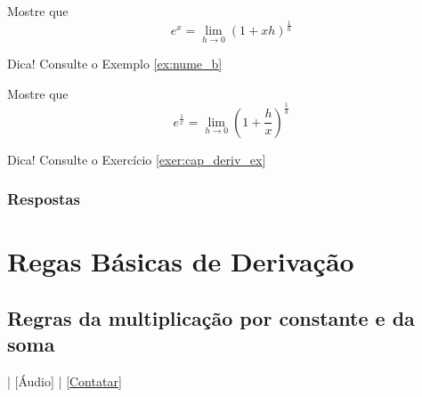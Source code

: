 \begin{exer}\label{exer:cap_deriv_ex}
  Mostre que
  \begin{equation}
    e^x = \lim_{h\to 0}\left(1 + xh\right)^{\frac{1}{h}}
  \end{equation}
\end{exer}
\begin{resp}
  Dica! Consulte o Exemplo \ref{ex:nume_b}
\end{resp}

\begin{exer}\label{exer:cap_deriv_defe1ox}
  Mostre que
  \begin{equation}
    e^{\frac{1}{x}} = \lim_{h\to 0}\left(1 + \frac{h}{x}\right)^{\frac{1}{h}}
  \end{equation}
\end{exer}
\begin{resp}
  Dica! Consulte o Exercício \ref{exer:cap_deriv_ex}
\end{resp}

\ifisbook
\subsubsection{Respostas}
\shipoutAnswer
\fi


\section{Regas Básicas de Derivação}\label{cap_deriv_sec_regrasderiv}

\subsection{Regras da multiplicação por constante e da soma}\label{cap_deriv_sec_regrasderiv:ssec:deriv_rmcs}

\begin{flushright}
  [Vídeo] | [Áudio] | \href{https://phkonzen.github.io/notas/contato.html}{[Contatar]}
\end{flushright}

